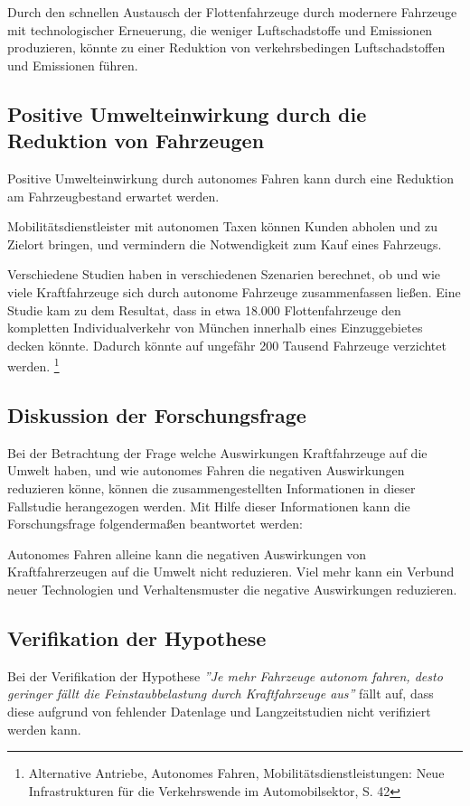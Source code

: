 Durch den schnellen Austausch der Flottenfahrzeuge durch modernere Fahrzeuge mit technologischer Erneuerung,
die weniger Luftschadstoffe und Emissionen produzieren, könnte zu einer Reduktion von verkehrsbedingen Luftschadstoffen und Emissionen führen.

\subsection{Positive Umwelteinwirkung durch die Reduktion von Fahrzeugen}
Positive Umwelteinwirkung durch autonomes Fahren kann durch eine
Reduktion am Fahrzeugbestand erwartet werden.

Mobilitätsdienstleister mit autonomen Taxen können
Kunden abholen und zu Zielort bringen,
und vermindern die Notwendigkeit zum Kauf eines Fahrzeugs.

Verschiedene Studien haben in verschiedenen Szenarien berechnet, ob und wie viele Kraftfahrzeuge sich durch autonome Fahrzeuge zusammenfassen ließen.
Eine Studie kam zu dem Resultat, dass in etwa 18.000 Flottenfahrzeuge den kompletten Individualverkehr von München innerhalb eines Einzuggebietes decken könnte.
Dadurch könnte auf ungefähr 200 Tausend Fahrzeuge verzichtet werden.
\footnote{Alternative Antriebe, Autonomes Fahren,
	Mobilitätsdienstleistungen: Neue Infrastrukturen für
	die Verkehrswende im Automobilsektor, S. 42}

\newpage

\subsection{Diskussion der Forschungsfrage}
Bei der Betrachtung der Frage welche Auswirkungen Kraftfahrzeuge auf die Umwelt haben, und wie autonomes Fahren die negativen Auswirkungen reduzieren könne,
können die zusammengestellten Informationen in dieser Fallstudie herangezogen werden.
Mit Hilfe dieser Informationen kann die Forschungsfrage folgendermaßen beantwortet werden:

Autonomes Fahren alleine kann die negativen Auswirkungen von Kraftfahrerzeugen auf die Umwelt nicht reduzieren.
Viel mehr kann ein Verbund neuer Technologien und Verhaltensmuster die negative Auswirkungen reduzieren.

\subsection{Verifikation der Hypothese}
Bei der Verifikation der Hypothese \textit{''Je mehr Fahrzeuge
	autonom fahren, desto geringer fällt die Feinstaubbelastung durch Kraftfahrzeuge aus''}
fällt auf, dass diese aufgrund von fehlender Datenlage und Langzeitstudien nicht verifiziert werden kann.
